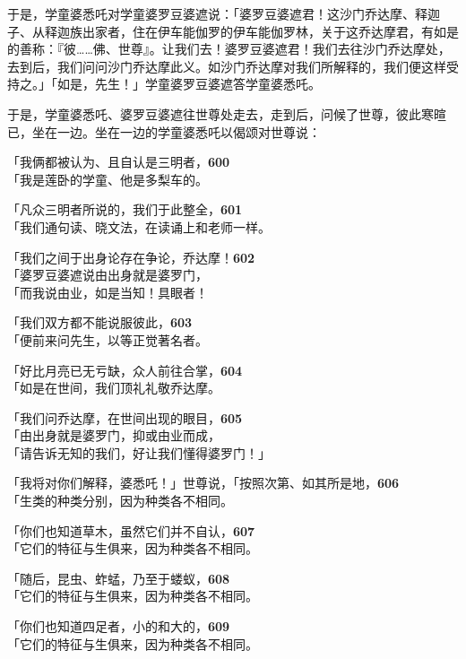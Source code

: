 于是，学童婆悉吒对学童婆罗豆婆遮说：「婆罗豆婆遮君！这沙门乔达摩、释迦子、从释迦族出家者，住在伊车能伽罗的伊车能伽罗林，关于这乔达摩君，有如是的善称：『彼……佛、世尊』。让我们去！婆罗豆婆遮君！我们去往沙门乔达摩处，去到后，我们问问沙门乔达摩此义。如沙门乔达摩对我们所解释的，我们便这样受持之。」「如是，先生！」学童婆罗豆婆遮答学童婆悉吒。

于是，学童婆悉吒、婆罗豆婆遮往世尊处走去，走到后，问候了世尊，彼此寒暄已，坐在一边。坐在一边的学童婆悉吒以偈颂对世尊说：

「我俩都被认为、且自认是三明者，\hfill{\grayfootnotesize \textbf{600}} \\
「我是莲卧的学童、他是多梨车的。


「凡众三明者所说的，我们于此整全，\hfill{\grayfootnotesize \textbf{601}} \\
「我们通句读、晓文法，在读诵上和老师一样。


「我们之间于出身论存在争论，乔达摩！\hfill{\grayfootnotesize \textbf{602}} \\
「婆罗豆婆遮说由出身就是婆罗门，\\
「而我说由业，如是当知！具眼者！


「我们双方都不能说服彼此，\hfill{\grayfootnotesize \textbf{603}} \\
「便前来问先生，以等正觉著名者。

「好比月亮已无亏缺，众人前往合掌，\hfill{\grayfootnotesize \textbf{604}} \\
「如是在世间，我们顶礼礼敬乔达摩。


「我们问乔达摩，在世间出现的眼目，\hfill{\grayfootnotesize \textbf{605}} \\
「由出身就是婆罗门，抑或由业而成，\\
「请告诉无知的我们，好让我们懂得婆罗门！」


「我将对你们解释，婆悉吒！」世尊说，「按照次第、如其所是地，\hfill{\grayfootnotesize \textbf{606}} \\
「生类的种类分别，因为种类各不相同。


「你们也知道草木，虽然它们并不自认，\hfill{\grayfootnotesize \textbf{607}} \\
「它们的特征与生俱来，因为种类各不相同。


「随后，昆虫、蚱蜢，乃至于蝼蚁，\hfill{\grayfootnotesize \textbf{608}} \\
「它们的特征与生俱来，因为种类各不相同。


「你们也知道四足者，小的和大的，\hfill{\grayfootnotesize \textbf{609}} \\
「它们的特征与生俱来，因为种类各不相同。


